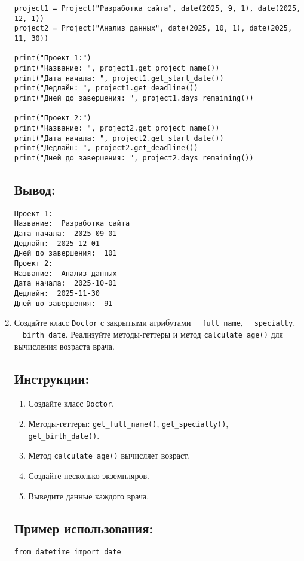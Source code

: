 \begin{enumerate}
\begin{lstlisting}[caption=Пример кода]
project1 = Project("Разработка сайта", date(2025, 9, 1), date(2025, 12, 1))
project2 = Project("Анализ данных", date(2025, 10, 1), date(2025, 11, 30))

print("Проект 1:")
print("Название: ", project1.get_project_name())
print("Дата начала: ", project1.get_start_date())
print("Дедлайн: ", project1.get_deadline())
print("Дней до завершения: ", project1.days_remaining())

print("Проект 2:")
print("Название: ", project2.get_project_name())
print("Дата начала: ", project2.get_start_date())
print("Дедлайн: ", project2.get_deadline())
print("Дней до завершения: ", project2.days_remaining())
\end{lstlisting}

\subsection*{Вывод:}
\begin{lstlisting}[caption=Ожидаемый вывод]
Проект 1:
Название:  Разработка сайта
Дата начала:  2025-09-01
Дедлайн:  2025-12-01
Дней до завершения:  101
Проект 2:
Название:  Анализ данных
Дата начала:  2025-10-01
Дедлайн:  2025-11-30
Дней до завершения:  91
\end{lstlisting}

\item
Создайте класс \texttt{Doctor} с закрытыми атрибутами \texttt{\_\_full\_name}, \texttt{\_\_specialty}, \texttt{\_\_birth\_date}. Реализуйте методы-геттеры и метод \texttt{calculate\_age()} для вычисления возраста врача.

\subsection*{Инструкции:}
\begin{enumerate}
    \item Создайте класс \texttt{Doctor}.
    \item Методы-геттеры: \texttt{get\_full\_name()}, \texttt{get\_specialty()}, \texttt{get\_birth\_date()}.
    \item Метод \texttt{calculate\_age()} вычисляет возраст.
    \item Создайте несколько экземпляров.
    \item Выведите данные каждого врача.
\end{enumerate}

\subsection*{Пример использования:}
\begin{lstlisting}[caption=Пример кода]
from datetime import date


\end{lstlisting}
\end{enumerate}

